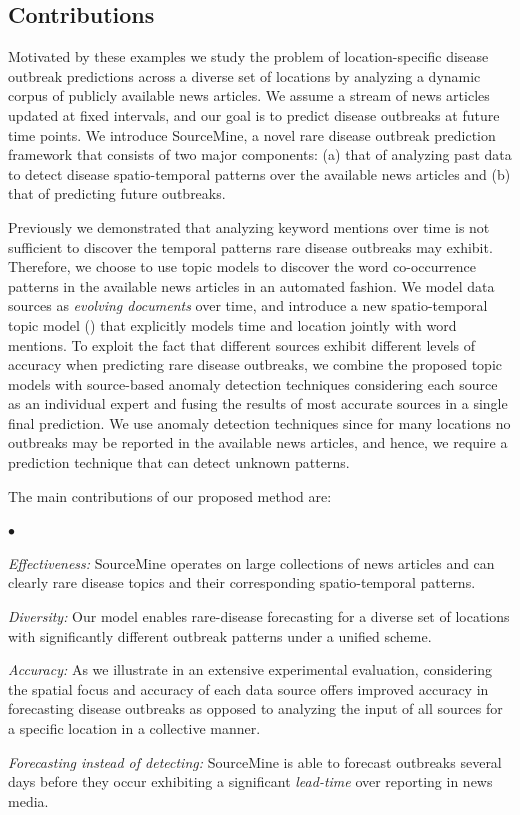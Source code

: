 \documentclass[conference]{IEEEtran}
\newcommand{\squishlist}{
   \begin{list}{$\bullet$}
    {
      \setlength{\itemsep}{0pt}
      \setlength{\parsep}{3pt}
      \setlength{\topsep}{3pt}
      \setlength{\partopsep}{0pt}
      \setlength{\leftmargin}{1.5em}
      \setlength{\labelwidth}{1em}
      \setlength{\labelsep}{0.5em} } }
\newcommand{\squishend}{
    \end{list}  }
\newcommand{\fullmodel}{{{\sf SourceMine}}\xspace}
\begin{document}
\subsection{Contributions}
\label{sec:contr}

Motivated by these examples we study the problem of location-specific disease outbreak predictions across a diverse set of locations by analyzing a dynamic corpus of publicly available news articles. We assume a stream of news articles updated at fixed intervals, and our goal is to predict disease outbreaks at future time points. We introduce \fullmodel, a novel rare disease outbreak prediction framework that consists of two major components: (a) that of analyzing past data to detect disease spatio-temporal patterns over the available news articles and (b) that of predicting future outbreaks. 

Previously we demonstrated that analyzing keyword mentions over time is not sufficient to discover the temporal patterns rare disease outbreaks may exhibit. Therefore, we choose to use topic models to discover the word co-occurrence patterns in the available news articles in an automated fashion. We model data sources as {\em evolving documents} over time, and introduce a new spatio-temporal topic model () that explicitly models time and location jointly with word mentions. To exploit the fact that different sources exhibit different levels of accuracy when predicting rare disease outbreaks, we combine the proposed topic models with source-based anomaly detection techniques considering each source as an individual expert and fusing the results of most accurate sources in a single final prediction. We use anomaly detection techniques since for many locations no outbreaks may be reported in the available news articles, and hence, we require a prediction technique that can detect  unknown patterns.

The main contributions of our proposed method are:
\squishlist
\item {\em Effectiveness:} \fullmodel operates on large collections of news articles and can clearly rare disease topics and their corresponding spatio-temporal patterns.
\item {\em Diversity:} Our model enables rare-disease forecasting for a diverse set of locations with significantly different outbreak patterns under a unified scheme. 
\item {\em Accuracy:} As we illustrate in an extensive experimental evaluation, considering the spatial focus and accuracy of each data source offers improved accuracy in forecasting disease outbreaks as opposed to analyzing the input of all sources for a specific location in a collective manner. 
\item{\em Forecasting instead of detecting:} \fullmodel is able to forecast outbreaks several days before they occur exhibiting a significant {\em lead-time} over reporting in news media. 
\squishend
\end{document}
